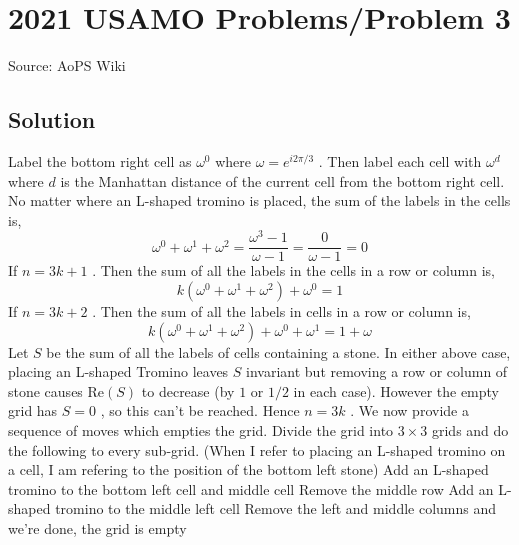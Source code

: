 \documentclass[12pt]{article}
\begin{document}
\section*{{2021 USAMO Problems/Problem 3}}
Source: AoPS Wiki

\subsection*{Solution}
Label the bottom right cell as $\omega^0$ where $\omega = e^{i2\pi/3}$ . Then label each cell with $\omega^d$ where $d$ is the Manhattan distance of the current cell from the bottom right cell. No matter where an L-shaped tromino is placed, the sum of the labels in the cells is, \[\omega^0 + \omega^1 + \omega^2 = \frac{\omega^3 - 1}{\omega - 1} = \frac{0}{\omega - 1} = 0\] If $n = 3k + 1$ . Then the sum of all the labels in the cells in a row or column is, \[k(\omega^0 + \omega^1 + \omega^2)+\omega^0 = 1\] If $n = 3k + 2$ . Then the sum of all the labels in cells in a row or column is, \[k(\omega^0 + \omega^1 + \omega^2) + \omega^0 + \omega^1 = 1 + \omega\] Let $S$ be the sum of all the labels of cells containing a stone. In either above case, placing an L-shaped Tromino leaves $S$ invariant but removing a row or column of stone causes $\textrm{Re}(S)$ to decrease (by $1$ or $1/2$ in each case). However the empty grid has $S=0$ , so this can't be reached. Hence $n=3k$ . We now provide a sequence of moves which empties the grid. Divide the grid into $3\times 3$ grids and do the following to every sub-grid. (When I refer to placing an L-shaped tromino on a cell, I am refering to the position of the bottom left stone) Add an L-shaped tromino to the bottom left cell and middle cell Remove the middle row Add an L-shaped tromino to the middle left cell Remove the left and middle columns and we're done, the grid is empty
\end{document}
